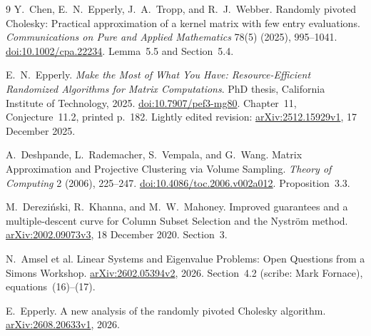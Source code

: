 \documentclass[10pt,letterpaper]{article}
\begin{document}
\begin{thebibliography}{9}
Y.~Chen, E.~N.~Epperly, J.~A.~Tropp, and R.~J.~Webber.
\newblock Randomly pivoted Cholesky: Practical approximation of a kernel
matrix with few entry evaluations.
\newblock \emph{Communications on Pure and Applied Mathematics}
78(5) (2025), 995--1041.
\newblock \href{https://doi.org/10.1002/cpa.22234}{doi:10.1002/cpa.22234}.
Lemma~5.5 and Section~5.4.

E.~N.~Epperly.
\newblock \emph{Make the Most of What You Have: Resource-Efficient
Randomized Algorithms for Matrix Computations}.
\newblock PhD thesis, California Institute of Technology, 2025.
\newblock \href{https://doi.org/10.7907/pef3-mg80}{doi:10.7907/pef3-mg80}.
Chapter~11, Conjecture~11.2, printed p.~182.
Lightly edited revision:
\href{https://arxiv.org/abs/2512.15929v1}{arXiv:2512.15929v1},
17 December 2025.

A.~Deshpande, L.~Rademacher, S.~Vempala, and G.~Wang.
\newblock Matrix Approximation and Projective Clustering via Volume Sampling.
\newblock \emph{Theory of Computing} 2 (2006), 225--247.
\newblock \href{https://doi.org/10.4086/toc.2006.v002a012}
{doi:10.4086/toc.2006.v002a012}. Proposition~3.3.

M.~Derezi\'{n}ski, R.~Khanna, and M.~W.~Mahoney.
\newblock Improved guarantees and a multiple-descent curve for Column Subset
Selection and the Nystr\"om method.
\newblock \href{https://arxiv.org/abs/2002.09073v3}{arXiv:2002.09073v3},
18 December 2020. Section~3.

N.~Amsel et al.
\newblock Linear Systems and Eigenvalue Problems: Open Questions from a
Simons Workshop.
\newblock \href{https://arxiv.org/abs/2602.05394v2}{arXiv:2602.05394v2}, 2026.
Section~4.2 (scribe: Mark Fornace), equations~(16)--(17).

E.~Epperly.
\newblock A new analysis of the randomly pivoted Cholesky algorithm.
\newblock \href{https://arxiv.org/abs/2608.20633}{arXiv:2608.20633v1}, 2026.
\end{thebibliography}
\end{document}
